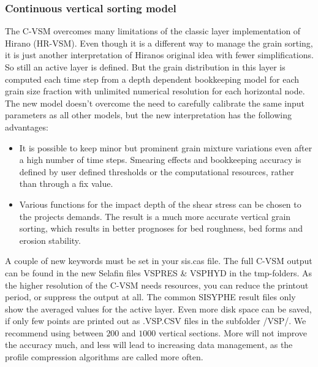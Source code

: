\subsubsection{Continuous vertical sorting model}

The C-VSM overcomes many limitations of the classic layer implementation of Hirano (HR-VSM).
Even though it is a different way to manage the grain sorting, it is just another interpretation of Hiranos
original idea with fewer simplifications. So still an active layer is defined. But the grain distribution in this layer
is computed each time step from a depth dependent bookkeeping model for each grain size fraction with unlimited numerical
resolution for each horizontal node.
The new model doesn't overcome the need to carefully calibrate the same
input parameters as all other models, but the new interpretation has the following advantages:

\begin{itemize}
\item It is possible to keep minor but prominent grain mixture variations even after a high number of time
steps. Smearing effects and bookkeeping accuracy is defined by user defined thresholds or the
computational resources, rather than through a fix value.

\item Various functions for the impact depth of the shear stress can be chosen to the projects demands.
The result is a much more accurate vertical grain sorting, which results in better prognoses for bed
roughness, bed forms and erosion stability.
\end{itemize}

A couple of new keywords must be set in your sis.cas file.
The full C-VSM output can be found in the new Selafin files VSPRES \& VSPHYD in the tmp-folders. As the higher
resolution of the C-VSM needs resources, you can reduce the printout period, or suppress the output at all. The
common SISYPHE result files only show the averaged values for the active layer. 
Even more disk space can be saved, if only few points are printed out as .VSP.CSV 
files in the subfolder /VSP/. We recommend using between $200$ and $1000$ vertical sections.
More will not improve the accuracy much, and less will lead to increasing data management, as the profile compression
algorithms are called more often. 

